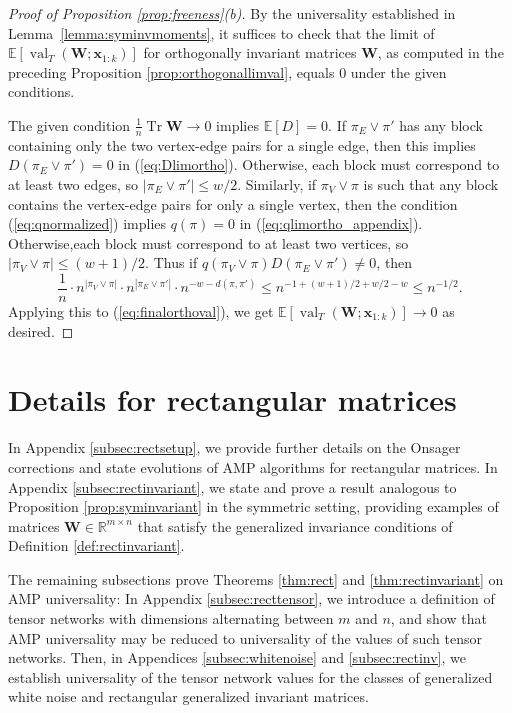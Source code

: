 \documentclass[10pt,reqno]{amsart}
\def\x{\mathbf{x}}
\def\W{\mathbf{W}}
\def\E{\mathbb{E}}
\def\R{\mathbb{R}}
\def\val{\operatorname{val}}
\def\bW{{\mathbf{W}}}
\def\Tr{\operatorname{Tr}}
\begin{document}
\begin{proof}[Proof of Proposition \ref{prop:freeness}(b)]
By the universality established in Lemma~\ref{lemma:syminvmoments}, it suffices
to check that the limit of $\E[\val_T(\W;\x_{1:k})]$ for orthogonally invariant
matrices $\W$, as computed in the preceding Proposition
\ref{prop:orthogonallimval}, equals 0
under the given conditions.

The given condition $\frac{1}{n}\Tr \W \to 0$ implies $\E[D]=0$.
If $\pi_E \vee \pi'$ has any block containing only the two 
vertex-edge pairs for a single edge, then this implies
$D(\pi_E \vee \pi')=0$ in (\ref{eq:Dlimortho}). Otherwise, each
block must correspond to at least two edges, so $|\pi_E \vee \pi'| \leq w/2$.
Similarly, if $\pi_V \vee \pi$ is such that any block contains the
vertex-edge pairs for only a single vertex, then the condition
(\ref{eq:qnormalized}) implies $q(\pi)=0$ in (\ref{eq:qlimortho_appendix}). 
Otherwise,each block must correspond to at least two vertices,
so $|\pi_V \vee \pi| \leq (w+1)/2$. Thus if $q(\pi_V  \vee \pi)D(\pi_E \vee
\pi') \neq 0$, then
\[\frac{1}{n} \cdot n^{|\pi_V \vee \pi|} \cdot n^{|\pi_E \vee \pi'|}
\cdot n^{-w-d(\pi,\pi')}
\leq n^{-1+(w+1)/2+w/2-w} \leq n^{-1/2}.\]
Applying this to (\ref{eq:finalorthoval}), we get
$\E[\val_T(\W;\x_{1:k})] \to 0$ as desired.
\end{proof}


\section{Details for rectangular matrices}\label{appendix:rect}

In Appendix \ref{subsec:rectsetup}, we provide further details on the
Onsager corrections and state evolutions of AMP algorithms for rectangular
matrices. In Appendix \ref{subsec:rectinvariant}, we state and prove a result
analogous to Proposition \ref{prop:syminvariant} in the symmetric setting,
providing examples of matrices $\bW \in \R^{m \times n}$ that
satisfy the generalized invariance conditions of Definition
\ref{def:rectinvariant}.

The remaining subsections prove
Theorems \ref{thm:rect} and \ref{thm:rectinvariant} on AMP universality:
In Appendix \ref{subsec:recttensor}, we introduce a definition of tensor networks with
dimensions alternating between $m$ and $n$, and show that AMP universality may
be reduced to universality of the values of such tensor networks. Then, in
Appendices \ref{subsec:whitenoise} and \ref{subsec:rectinv}, we establish
universality of the tensor network values for the classes of generalized white
noise and rectangular generalized invariant matrices.
\end{document}
